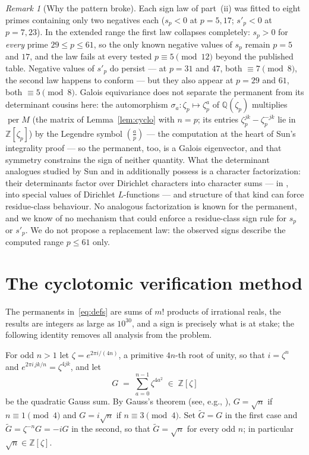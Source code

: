 \documentclass[10pt]{article}
\theoremstyle{remark}
\newtheorem{remark}[theorem]{Remark}
\DeclareMathOperator{\per}{per}
\newcommand{\Z}{\mathbb{Z}}
\newcommand{\Q}{\mathbb{Q}}
\begin{document}
\begin{remark}[Why the pattern broke]\label{rem:pattern}
Each sign law of part~(ii) was fitted to eight primes containing only two
negatives each ($s_p<0$ at $p=5,17$; $s'_p<0$ at $p=7,23$). In the extended
range the first law collapses completely: $s_p>0$ for \emph{every} prime
$29\le p\le 61$, so the only known negative values of $s_p$ remain $p=5$
and $17$, and the law fails at every tested $p\equiv 5\pmod{12}$ beyond the
published table. Negative values of $s'_p$ do persist --- at $p=31$ and
$47$, both $\equiv 7\pmod 8$, the second law happens to conform --- but
they also appear at $p=29$ and $61$, both $\equiv 5\pmod 8$. Galois
equivariance does not separate the permanent from its determinant
cousins here: the automorphism $\sigma_a\colon\zeta_p\mapsto\zeta_p^a$ of
$\Q(\zeta_p)$ multiplies $\per M$ (the matrix of Lemma~\ref{lem:cyclo}
with $n=p$; its entries $\zeta_p^{jk}-\zeta_p^{-jk}$ lie in
$\Z[\zeta_p]$) by the Legendre symbol $(\tfrac ap)$
--- the computation at the heart of Sun's integrality proof --- so the
permanent, too, is a Galois eigenvector, and that symmetry constrains
the sign of neither quantity. What the determinant analogues studied by Sun and in
\cite{GaoGuo2025} additionally possess is a character factorization:
their determinants factor over Dirichlet characters into character sums
--- in \cite{GaoGuo2025}, into special values of Dirichlet $L$-functions
--- and structure of that kind can force residue-class behaviour. No
analogous factorization is known for the permanent, and we know of no
mechanism that could enforce a residue-class sign rule for $s_p$ or
$s'_p$. We do not propose a replacement law: the observed signs describe
the computed range $p\le 61$ only.
\end{remark}

\section{The cyclotomic verification method}\label{sec:method}

The permanents in~\eqref{eq:defs} are sums of $m!$ products of irrational
reals, the results are integers as large as $10^{30}$, and a sign is
precisely what is at stake; the following identity removes all analysis
from the problem.

For odd $n>1$ let $\zeta=e^{2\pi i/(4n)}$, a primitive $4n$-th root of
unity, so that $i=\zeta^{n}$ and $e^{2\pi i\,jk/n}=\zeta^{4jk}$, and let
\[
G \;=\; \sum_{a=0}^{n-1} \zeta^{4a^2} \;\in\; \Z[\zeta]
\]
be the quadratic Gauss sum. By Gauss's theorem (see, e.g.,
\cite[Thm.~1.5.2]{BEW1998}), $G=\sqrt n$ if $n\equiv 1\pmod 4$ and
$G=i\sqrt n$ if $n\equiv 3\pmod 4$. Set $\widetilde G=G$ in the first case
and $\widetilde G=\zeta^{-n}G=-iG$ in the second, so that
$\widetilde G=\sqrt n$ for every odd $n$; in particular
$\sqrt n\in\Z[\zeta]$.
\end{document}
